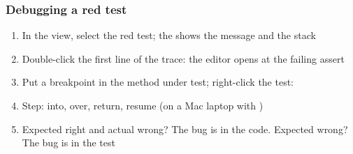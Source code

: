 \documentclass[aspectratio=169,10pt,compress]{beamer}
\begin{document}
\begin{frame}[t,fragile] \frametitle{Debugging a red test}
	\begin{enumerate}\small
		\item In the  view, select the red test; the  shows the message and the stack
		\item Double-click the first line of the trace: the editor opens at the failing assert
		\item Put a breakpoint in the method under test; right-click the test: 
		\item Step:  into,  over,  return,  resume (on a Mac laptop with )
		\item Expected right and actual wrong? The bug is in the code. Expected wrong? The bug is in the test
	\end{enumerate}
\end{frame}




\end{document}
